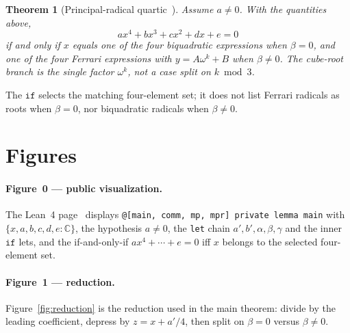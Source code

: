 \documentclass[11pt,a4paper]{article}
\newtheorem{theorem}{Theorem}[section]
\newcommand{\C}{\mathbb{C}}
\begin{document}
\begin{theorem}[Principal-radical quartic~\cite{lemma_quartic_lean}]
\label{thm:quartic}
Assume \(a\neq 0\).
With the quantities above,
\[
ax^4+bx^3+cx^2+dx+e=0
\]
if and only if \(x\) equals one of the four biquadratic expressions when \(\beta=0\), and one of the four Ferrari expressions with \(y=A\omega^{k}+B\) when \(\beta\neq 0\).
The cube-root branch is the single factor \(\omega^{k}\), not a case split on \(k\bmod 3\).
\end{theorem}

The \(\mathtt{if}\) selects the matching four-element set; it does not list Ferrari radicals as roots when \(\beta=0\), nor biquadratic radicals when \(\beta\neq 0\).

\section{Figures}
\label{sec:figures}

\paragraph{Figure~0 --- public visualization.}
The Lean~4 page~\cite{lemma_quartic_lean} displays \texttt{@[main, comm, mp, mpr] private lemma main} with \(\{x,a,b,c,d,e:\C\}\), the hypothesis \(a\neq 0\), the \texttt{let} chain \(a',b',\alpha,\beta,\gamma\) and the inner \(\mathtt{if}\) lets, and the if-and-only-if
\(ax^4+\cdots+e=0\) iff \(x\) belongs to the selected four-element set.

\paragraph{Figure~1 --- reduction.}
Figure~\ref{fig:reduction} is the reduction used in the main theorem: divide by the leading coefficient, depress by \(z=x+a'/4\), then split on \(\beta=0\) versus \(\beta\neq 0\).
\end{document}
